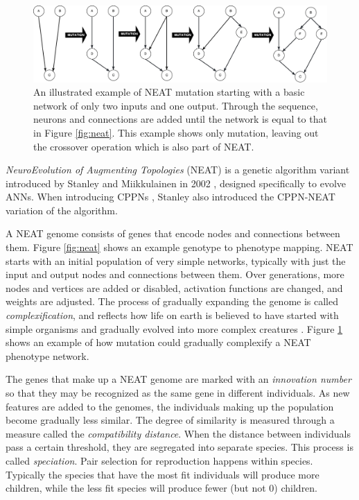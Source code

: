 \begin{figure}
\centering
\includegraphics[width=\columnwidth, keepaspectratio]{fig/NEAT_mutation}
\caption[Example of NEAT mutation]{
    An illustrated example of NEAT mutation starting with a basic network of only two inputs and one output.
    Through the sequence, neurons and connections are added until the network is equal to that in Figure \ref{fig:neat}.
    This example shows only mutation, leaving out the crossover operation which is also part of NEAT.
    }
\label{fig:neat_mutation}
\end{figure}

\textit{NeuroEvolution of Augmenting Topologies} (NEAT) is a genetic algorithm variant introduced by Stanley and Miikkulainen in 2002 \cite{stanley-2002},
designed specifically to evolve ANNs.
When introducing CPPNs \cite{stanley-2007}, Stanley also introduced the CPPN-NEAT variation of the algorithm.

A NEAT genome consists of genes that encode nodes and connections between them.
Figure \ref{fig:neat} shows an example genotype to phenotype mapping.
NEAT starts with an initial population of very simple networks, typically with just the input and output nodes and connections between them.
Over generations, more nodes and vertices are added or disabled, activation functions are changed, and weights are adjusted.
The process of gradually expanding the genome is called \textit{complexification},
and reflects how life on earth is believed to have started with simple organisms and gradually evolved into more complex creatures \cite{darnell1986speculations,pross2005emergence}.
Figure \ref{fig:neat_mutation} shows an example of how mutation could gradually complexify a NEAT phenotype network.

The genes that make up a NEAT genome are marked with an \textit{innovation number} so that they may be recognized as the same gene in different individuals.
As new features are added to the genomes, the individuals making up the population become gradually less similar.
The degree of similarity is measured through a measure called the \textit{compatibility distance}.
When the distance between individuals pass a certain threshold, they are segregated into separate species.
This process is called \textit{speciation}.
Pair selection for reproduction happens within species.
Typically the species that have the most fit individuals will produce more children,
while the less fit species will produce fewer (but not 0) children.

